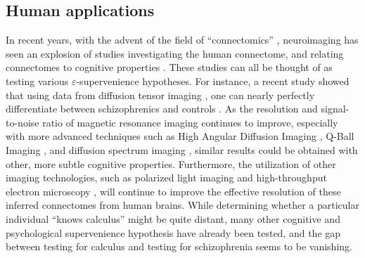 \documentclass{article}
\newcommand{\mB}{\mathcal{B}}
\newcommand{\mM}{\mathcal{M}}
\newcommand{\PP}{\mathbb{P}}           %
\newcommand{\eps}{\varepsilon}
\newcommand{\MeB}{\mM \overset{\varepsilon}{{\sim}}_{\PP} \mB}
\begin{document}
% 
% 

\subsection{Human applications} %
\label{par:human_applications}

In recent years, with the advent of the field of ``connectomics'' \cite{SpornsKotter05,Hagmann05}, neuroimaging has seen an explosion of studies investigating the human connectome, and relating connectomes to cognitive properties \cite{Jones10}.  These studies can all be thought of as testing various $\eps$-supervenience hypotheses.  For instance, a recent study showed that using data from diffusion tensor imaging \cite{Basser94}, one can nearly perfectly differentiate between schizophrenics and controls \cite{ArdekaniSzeszko10}.  As the resolution and signal-to-noise ratio of magnetic resonance imaging continues to improve, especially with more advanced techniques such as High Angular Diffusion Imaging \cite{TuchWedeen02}, Q-Ball Imaging \cite{Tuch04}, and diffusion spectrum imaging \cite{WedeenWeisskoff05}, similar results could be obtained with other, more subtle cognitive properties.  Furthermore, the utilization of other imaging technologies, such as polarized light imaging \cite{PalmAmunts10} and high-throughput electron microscopy \cite{DenkHorstmann04,HayworthLichtman06}, will continue to improve the effective resolution of these inferred connectomes from human brains. While determining whether a particular individual ``knows calculus'' might be quite distant, many other cognitive and psychological supervenience hypothesis have already been tested, and the gap between testing for calculus and testing for schizophrenia seems to be vanishing.


\end{document}
